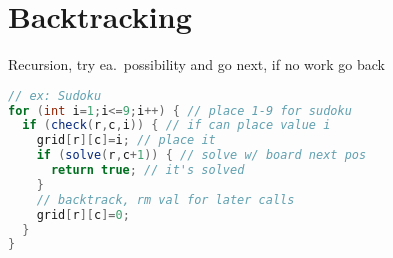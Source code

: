 \section{Backtracking}
Recursion, try ea.\ possibility and go next, if no work go back
\begin{lstlisting}[language=Java,basicstyle=\tiny]
// ex: Sudoku
for (int i=1;i<=9;i++) { // place 1-9 for sudoku
  if (check(r,c,i)) { // if can place value i
    grid[r][c]=i; // place it
    if (solve(r,c+1)) { // solve w/ board next pos
      return true; // it's solved
    }
    // backtrack, rm val for later calls
    grid[r][c]=0;
  }
}
\end{lstlisting}
